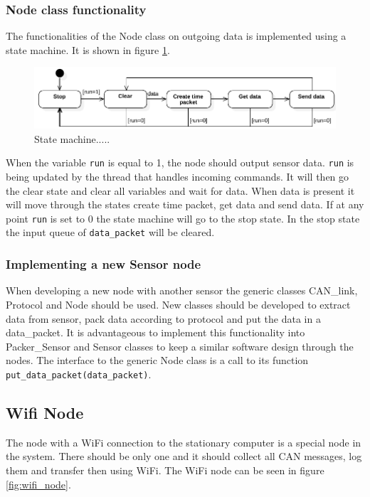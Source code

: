 \subsubsection*{Node class functionality}
The functionalities of the Node class on outgoing data is implemented using a state machine.
It is shown in figure \ref{fig:state_machine}.
\begin{figure}[!h]
\centering
\includegraphics[width=1\textwidth]{graphics/StateDiagram_Node.pdf}
\caption{State machine.....}
\label{fig:state_machine}
\end{figure}
When the variable \texttt{run} is equal to 1, the node should output sensor data.
\texttt{run} is being updated by the thread that handles incoming commands.
It will then go the clear state and clear all variables and wait for data. 
When data is present it will move through the states create time packet, get data and send data. 
If at any point \texttt{run} is set to 0 the state machine will go to the stop state.
In the stop state the input queue of \texttt{data\_packet} will be cleared.

\subsubsection*{Implementing a new Sensor node}
When developing a new node with another sensor the generic classes CAN\_link, Protocol and Node should be used. 
New classes should be developed to extract data from sensor, pack data according to protocol and put the data in a data\_packet.
It is advantageous to implement this functionality into Packer\_Sensor and Sensor classes to keep a similar software design through the nodes.
The interface to the generic Node class is a call to its function \texttt{put\_data\_packet(data\_packet)}.


















\subsection{Wifi Node}
The node with a WiFi connection to the stationary computer is a special node in the system.
There should be only one and it should collect all CAN messages, log them and transfer then using WiFi.
The WiFi node can be seen in figure \ref{fig:wifi_node}.

